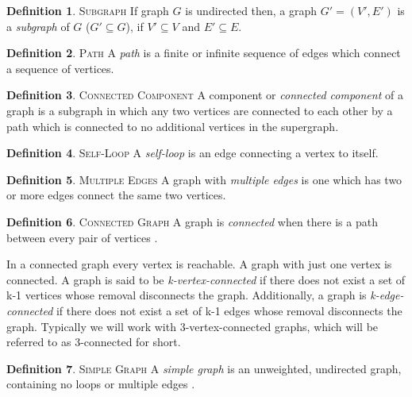 \documentclass[11pt]{article}
\theoremstyle{definition}
\newtheorem{definition}{Definition}[section]
\begin{document}
	\theoremstyle{definition}
	\begin{definition}{\textsc{Subgraph}}
			If graph $G$ is undirected then, a graph $G' = (V',E')$ is a \emph{subgraph} of $G$ ($G' \subseteq G$), if $V' \subseteq V$ and $E' \subseteq E$.
  	\end{definition}

	\theoremstyle{definition}
	\begin{definition}{\textsc{Path}}
		A \emph{path} is a finite or infinite sequence of edges which connect a sequence of vertices.
	\end{definition}
	
	\theoremstyle{definition}
  	\begin{definition}{\textsc{Connected Component}}
		A component or \emph{connected component} of a graph is a subgraph in which any two vertices are connected to each other by a path which is connected to no additional vertices in the supergraph.
	\end{definition}
	
	\theoremstyle{definition}
	\begin{definition}{\textsc{Self-Loop}}
  		A \emph{self-loop} is an edge connecting a vertex to itself.
  	\end{definition}
	
	\theoremstyle{definition}
	\begin{definition}{\textsc{Multiple Edges}}
  		A graph with \emph{multiple edges} is one which has two or more edges connect the same two vertices.
	\end{definition}
	
	\theoremstyle{definition}
	\begin{definition}{\textsc{Connected Graph}}
		A graph is \emph{connected} when there is a path between every pair of vertices \cite{mathworld:ConnectedGraphs}. 
	\end{definition}

	In a connected graph every vertex is reachable. A graph with just one vertex is connected. 
	A graph is said to be \emph{k-vertex-connected} if there does not exist a set of k-1 vertices whose removal disconnects the graph. 
	Additionally, a graph is \emph{k-edge-connected} if there does not exist a set of k-1 edges whose removal disconnects the graph. 
	Typically we will work with 3-vertex-connected graphs, which will be referred to as 3-connected for short.

	\theoremstyle{definition}
	\begin{definition}{\textsc{Simple Graph}}  
  		A \emph{simple graph} is an unweighted, undirected graph, containing no loops or multiple edges \cite{mathworld:SimpleGraphs}. 
	\end{definition}
	
\end{document}
